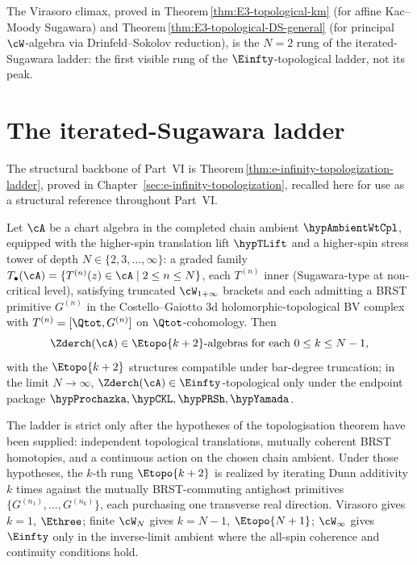 The Virasoro climax, proved in
Theorem\,\ref{thm:E3-topological-km} (for affine Kac--Moody Sugawara) and
Theorem\,\ref{thm:E3-topological-DS-general} (for principal $\cW$-algebra
via Drinfeld--Sokolov reduction), is the $N=2$ rung of the
iterated-Sugawara ladder: the first visible rung of the
$\Einfty$-topological ladder, not its peak.

\section{The iterated-Sugawara ladder}
\label{sec:part-vi-ladder-preview}

The structural backbone of Part~VI is
Theorem\,\ref{thm:e-infinity-topologization-ladder}, proved in
Chapter~\ref{sec:e-infinity-topologization}, recalled here for use
as a structural reference throughout Part~VI.

\begin{theoremref}
\label{thm:part-vi-ladder-recall}
Let $\cA$ be a chart algebra in the completed chain ambient
\(\hypAmbientWtCpl\), equipped with the higher-spin translation lift
\(\hypTLift\) and a higher-spin stress tower of depth
$N \in \{2, 3, \ldots, \infty\}$: a graded family
$T_\bullet(\cA) = \{T^{(n)}(z) \in \cA \mid 2 \le n \le N\}$, each
$T^{(n)}$ inner (Sugawara-type at non-critical level), satisfying
truncated $\cW_{1+\infty}$ brackets and each admitting a BRST primitive
$G^{(n)}$ in the Costello--Gaiotto 3d holomorphic-topological BV complex
with $T^{(n)} = [\Qtot, G^{(n)}]$ on $\Qtot$-cohomology. Then
\begin{equation}
 \Zderch(\cA) \in \Etopo{k+2}\text{-algebras for each } 0 \le k \le N-1,
 \label{eq:part-vi-ladder-recall}
\end{equation}
with the $\Etopo{k+2}$ structures compatible under bar-degree truncation;
in the limit $N \to \infty$, $\Zderch(\cA) \in \Einfty$-topological
only under the endpoint package
\(\hypProchazka,\hypCKL,\hypPRSh,\hypYamada\).
\end{theoremref}

The ladder is strict only after the hypotheses of the topologisation
theorem have been supplied: independent topological translations,
mutually coherent BRST homotopies, and a continuous action on the
chosen chain ambient. Under those hypotheses, the $k$-th rung
$\Etopo{k+2}$ is realized by iterating Dunn additivity $k$ times
against the mutually BRST-commuting antighost primitives
$\{G^{(n_1)}, \ldots, G^{(n_k)}\}$, each purchasing one transverse real
direction. Virasoro gives $k=1$, $\Ethree$; finite $\cW_N$ gives
$k=N-1$, $\Etopo{N+1}$; $\cW_\infty$ gives $\Einfty$ only in the
inverse-limit ambient where the all-spin coherence and continuity
conditions hold.

